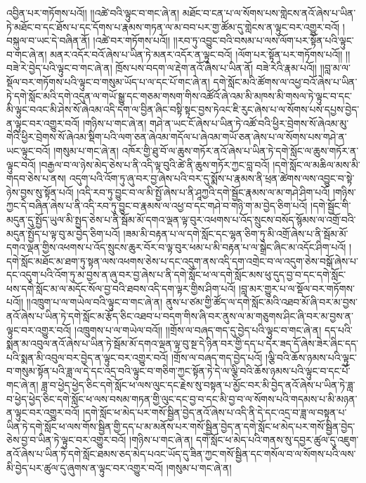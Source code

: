འབྱིན་པར་གཏོགས་པའོ།། །།འཚེ་བའི་ལྟུང་བ་གང་ཞེ་ན། མཐོང་བ་ངན་པ་ལ་སོགས་པས་གླེངས་ནའོ་ཞེས་པ་ཡིན་ཏེ་མཐོང་བ་དང་ཐོས་པ་དང་དོགས་པ་རྣམས་གཏན་ལ་མ་བབ་པར་གྱ་ཚོམ་དུ་གླེངས་ན་ལྟུང་བར་འགྱུར་བའོ། །བསྐུལ་བ་ཡང་དེ་བཞིན་ནོ། །འཚེ་བར་གཏོགས་པའོ།། །།རབ་ཏུ་འབྱུང་བའི་བསམ་པ་ལས་ལོག་པར་སྟོན་པའི་ལྟུང་བ་གང་ཞེ་ན། མནར་འདོར་བའོ་ཞེས་པ་ཡིན་ཏེ་མནར་འདོར་ན་ལྟུང་བའོ། །ལོག་པར་སྟོན་པར་གཏོགས་པའོ།། །།བཟེ་རེ་བྱེད་པའི་ལྟུང་བ་གང་ཞེ་ན། ཁྲོས་པས་བདག་ལ་རྡེག་ནའོ་ཞེས་པ་ཡིན་ནོ། བཟེ་རེའི་རྣམ་པའོ།། །།བླ་མ་ལ་སྡོལ་བར་གཏོགས་པའི་ལྟུང་བ་གསུམ་ཡོད་པ་ལ་དང་པོ་གང་ཞེ་ན། དགེ་སློང་མའི་ཚོགས་ལ་འཕྱ་བའོ་ཞེས་པ་ཡིན་ཏེ་དགེ་སློང་མའི་དགེ་འདུན་ལ་གཡོ་སྒྱུ་དང་གཅམ་གསག་གིས་འཚོའོ་ཞེ་འམ་མི་མཁས་མི་གསལ་ཏེ་ལྟུང་བ་དང་མི་ལྟུང་བའང་མི་ཤེས་སོ་ཞེའམ་འདི་དག་ལ་བྱིན་ཞིང་བསྟི་སྟང་བྱས་ཏེའང་ཇི་རུང་ཞེས་པ་ལ་སོགས་པས་དཔྱས་བྱེད་ན་ལྟུང་བར་འགྱུར་བའོ། །གཉིས་པ་གང་ཞེ་ན། གཤེ་ན་ཡང་ངོ་ཞེས་པ་ཡིན་ཏེ་འཚོ་བའི་ཕྱིར་བྲེགས་སོ་ཞེའམ་མུ་གེའི་ཕྱིར་བྲེགས་སོ་ཞེའམ་སྡིག་པའི་ལག་ཅན་ཞེའམ་གདོལ་པ་ཞེའམ་གཡོ་ཅན་ཞེས་པ་ལ་སོགས་པས་གཤེ་ན་ཡང་ལྟུང་བའོ། །གསུམ་པ་གང་ཞེ་ན། འཁོར་གྱི་ཐུ་བོ་ལ་ཆུས་གཏོར་ནའོ་ཞེས་པ་ཡིན་ཏེ་དགེ་སློང་ལ་ཆུས་གཏོར་ན་ལྟུང་བའོ། །བརྒྱལ་བ་ལ་ཉེས་མེད་ཅེས་པ་ནི་འདི་ལྟ་བུའི་ཚེ་ནི་ཆུས་གཏོར་ཀྱང་བླ་བའོ། །དགེ་སློང་ལ་མཆིལ་མས་མི་གདབ་ཅེས་པ་ནས། འདུག་པའི་འོག་ཏུ་ཞུ་བར་བྱ་ཞེས་པའི་བར་དུ་སྨོས་པ་རྣམས་ནི་ཕྲན་ཚེགས་ལས་འབྱུང་བ་སྟེ་ཉེས་བྱས་སུ་སྟོན་པའོ། །འདི་རབ་ཏུ་བྱུང་བ་ལ་མི་སྤྱོ་ཞེས་པ་ནི་ཤཱཀྱའི་དགེ་སྦྱོང་རྣམས་ལ་མ་གཤེ་ཤིག་པའོ། །གཉིས་ཀྱང་དེ་བཞིན་ཞེས་པ་ནི་འདི་རབ་ཏུ་བྱུང་བ་རྣམས་ལ་འཕྱ་བ་དང་གཤེ་བ་གཉི་ག་མ་བྱེད་ཅིག་པའོ། །དགེ་སྦྱོང་གི་མདུན་དུ་སྤྱོད་ཡུལ་མི་སྤྱད་ཅེས་པ་ནི་སྦོམ་མོ་དགའ་ལྡན་ལྟ་བུར་འཕགས་པ་འོད་སྲུངས་བསོད་སྙོམས་ལ་འགྲོ་བའི་མདུན་སྤྱོད་པ་ལྟ་བུ་མ་བྱེད་ཅིག་པའོ། །ཟམ་མི་བརྟན་པ་ལ་དགེ་སློང་དང་ལྷན་ཅིག་ཏུ་མི་འགྲོ་ཞེས་པ་ནི་སྦོམ་མོ་དགའ་ལྡན་གྱིས་འཕགས་པ་འོད་སྲུངས་ཆུར་བོར་བ་ལྟ་བུར་ཕམ་པ་མི་བརྟན་པ་ལ་སྒྲེང་ཞིང་མ་འདོང་ཤིག་པའོ། །དགེ་སློང་མཐོང་མ་ཐག་ཏུ་སྟན་ལས་འཕགས་ཅེས་པ་དང་འདུག་ནས་འདི་དག་འགྲེང་བ་ལ་འདུག་ཅེས་བསྒོ་ཞེས་པ་དང་འདུག་པའི་འོག་ཏུ་མ་བྱས་ན་ཞུ་བར་བྱ་ཞེས་པ་ནི་དགེ་སློང་ཕ་ལ་དགེ་སློང་མས་ཕུ་དུད་བྱ་བ་དང་དགེ་སློང་ཕས་དགེ་སློང་མ་ལ་མདོང་སོལ་བྱ་བའི་ཐབས་འདི་དག་ལྟར་གྱིས་ཤིག་པའོ། །བླ་མར་གྱུར་པ་ལ་སྡོལ་བར་གཏོགས་པའོ།། །།འཁྲུག་པ་ལ་གཡེལ་བའི་ལྟུང་བ་གང་ཞེ་ན། ནུས་པ་ཙམ་གྱི་ཚོད་ལ་དགེ་སློང་མའི་འཐབ་མོ་ཞི་བར་མ་བྱས་ནའོ་ཞེས་པ་ཡིན་ཏེ་དགེ་སློང་མ་རྩོད་ཅིང་འཐབ་པ་བདག་གིས་ཞི་བར་ནུས་ལ་མ་གཅུགས་ཤིང་ཞི་བར་མ་བྱས་ན་ལྟུང་བར་འགྱུར་བའོ། །འཁྲུགས་པ་ལ་གཡེལ་བའོ།། །།གྲོས་ལ་བཞད་གད་དུ་བྱེད་པའི་ལྟུང་བ་གང་ཞེ་ན། དད་པའི་སྨན་མ་འབུལ་ནའོ་ཞེས་པ་ཡིན་ཏེ་སྦོམ་མོ་དགའ་ལྡན་ལྟ་བུ་སྔ་དེ་ཉིན་བར་གྱི་དད་པ་དེར་ཟད་དོ་ཞེས་ཟེར་ཞིང་དད་པའི་སྨན་མི་འབུལ་བར་བྱེད་ན་ལྟུང་བར་འགྱུར་བའོ། །གྲོས་ལ་བཞད་གད་བྱེད་པའོ། །ལྕི་བའི་ཆོས་ཉམས་པའི་ལྟུང་བ་གསུམ་སྟོན་པའི་ཟླ་ལ་དེ་དང་འདྲ་བའི་ལྟུང་བ་གཅིག་ཀྱང་སྟོན་ཏེ་དེ་ལ་ལྕི་བའི་ཆོས་ཉམས་པའི་ལྟུང་བ་དང་པོ་གང་ཞེ་ན། ཟླ་བ་ཕྱེད་ཕྱེད་ཅིང་དགེ་སློང་ཕ་ལས་ལུང་དང་རྗེས་སུ་བསྟན་པ་མྱོང་བར་མི་བྱེད་ནའོ་ཞེས་པ་ཡིན་ཏེ་ཟླ་བ་ཕྱེད་ཕྱེད་ཅིང་དགེ་སློང་ཕ་ལས་བསམ་གཏན་གྱི་ལུང་དང་བྱ་བ་དང་མི་བྱ་བ་ལ་སོགས་པའི་གདམས་པ་མི་མཉན་ན་ལྟུང་བར་འགྱུར་བའོ། །དགེ་སློང་ཕ་མེད་པར་གསོ་སྦྱིན་བྱེད་ནའོ་ཞེས་པ་འདི་ནི་དེ་དང་འདྲ་བ་ཟླ་ལ་བསྟན་པ་ཡིན་ཏེ་དགེ་སློང་ཕ་ལས་གོས་སྦྱིན་གྱི་དད་པ་མ་མནོས་པར་གསོ་སྦྱིན་བྱེད་ན་དགེ་སློང་ཕ་མེད་པར་གསོ་སྦྱིན་བྱེད་ཅེས་བྱ་བ་ཡིན་ཏེ་ལྟུང་བར་འགྱུར་བའོ། །གཉིས་པ་གང་ཞེ་ན། དགེ་སློང་ཕ་མེད་པའི་གནས་སུ་དབྱར་ཚུལ་དུ་འཇུག་ནའོ་ཞེས་པ་ཡིན་ཏེ་དགེ་སློང་ཐམས་ཅད་མེད་པའང་ཡོད་དུ་ཟིན་ཀྱང་གསོ་སྦྱིན་དང་གསོལ་བ་ལ་སོགས་པའི་ལས་མི་བྱེད་པར་ཚུལ་དུ་ཞུགས་ན་ལྟུང་བར་འགྱུར་བའོ། །གསུམ་པ་གང་ཞེ་ན། 